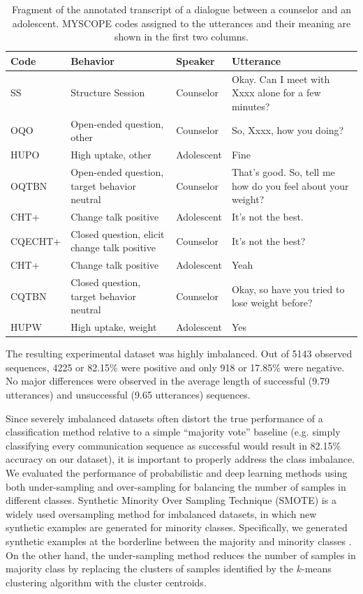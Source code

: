 \documentclass{amia_summit_2018}
\begin{document}
\begin{table}[h]
\caption{Fragment of the annotated transcript of a dialogue between a counselor and an adolescent. MYSCOPE codes assigned to the utterances and their meaning are shown in the first two columns.}    
\label{tab:anno_examp}
\centering
\begin{tabular}{|l|p{3.2cm}|l|p{8cm}|}
\hline
\bf{Code}  & \bf{Behavior} & \bf{Speaker} & \bf{Utterance} \\\hline
SS & Structure Session & Counselor & Okay. Can I meet with Xxxx alone for a few minutes? \\\hline
OQO & Open-ended question, other & Counselor & So, Xxxx, how you doing? \\\hline
HUPO &    High uptake, other    & Adolescent &    Fine \\\hline
OQTBN &    Open-ended question, target behavior neutral & Counselor &    That's good.  So, tell me  how do you feel about your weight? \\\hline
CHT+ &    Change talk positive    & Adolescent &    It's not the best. \\\hline
CQECHT+ & Closed question, elicit change talk positive & Counselor & It's not the best? \\\hline
CHT+ &    Change talk positive &    Adolescent & Yeah \\\hline
CQTBN &    Closed question, target behavior neutral  & Counselor &    Okay, so have you tried to lose weight before? \\\hline
HUPW &    High uptake, weight & Adolescent &    Yes \\\hline
\end{tabular}
\end{table}

The resulting experimental dataset was highly imbalanced. Out of 5143 observed sequences, 4225 or 82.15\% were positive and only 918 or 17.85\% were negative. No major differences were observed in the average length of successful (9.79 utterances) and unsuccessful (9.65 utterances) sequences.  

Since severely imbalanced datasets often distort the true performance of a classification method relative to a simple ``majority vote'' baseline (e.g. simply classifying every communication sequence as successful would result in 82.15\% accuracy on our dataset), it is important to properly address the class imbalance. We evaluated the performance of probabilistic and deep learning methods using both under-sampling and over-sampling for balancing the number of samples in different classes. Synthetic Minority Over Sampling Technique (SMOTE) \cite{chawla2002smote} is a widely used oversampling method for imbalanced datasets, in which new synthetic examples are generated for minority classes. Specifically, we generated synthetic examples at the borderline between the majority and minority classes \cite{nguyen2011borderline}. On the other hand, the under-sampling method reduces the number of samples in majority class by replacing the clusters of samples identified by the $k$-means clustering algorithm with the cluster centroids.
\end{document}
